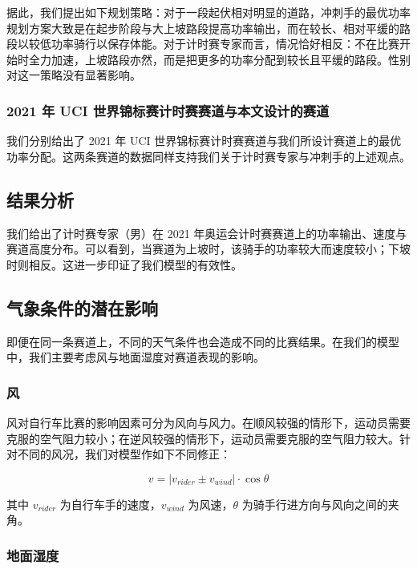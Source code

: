 \documentclass[11pt,a4paper]{ctexart}
\begin{document}
据此，我们提出如下规划策略：对于一段起伏相对明显的道路，冲刺手的最优功率规划方案大致是在起步阶段与大上坡路段提高功率输出，而在较长、相对平缓的路段以较低功率骑行以保存体能。对于计时赛专家而言，情况恰好相反：不在比赛开始时全力加速，上坡路段亦然，而是把更多的功率分配到较长且平缓的路段。性别对这一策略没有显著影响。

\subsubsection{2021 年 UCI 世界锦标赛计时赛赛道与本文设计的赛道}

我们分别给出了 2021 年 UCI 世界锦标赛计时赛赛道与我们所设计赛道上的最优功率分配。这两条赛道的数据同样支持我们关于计时赛专家与冲刺手的上述观点。

\subsection{结果分析}

我们给出了计时赛专家（男）在 2021 年奥运会计时赛赛道上的功率输出、速度与赛道高度分布。可以看到，当赛道为上坡时，该骑手的功率较大而速度较小；下坡时则相反。这进一步印证了我们模型的有效性。

\subsection{气象条件的潜在影响}

即便在同一条赛道上，不同的天气条件也会造成不同的比赛结果。在我们的模型中，我们主要考虑风与地面湿度对赛道表现的影响。

\subsubsection{风}

风对自行车比赛的影响因素可分为风向与风力。在顺风较强的情形下，运动员需要克服的空气阻力较小；在逆风较强的情形下，运动员需要克服的空气阻力较大。针对不同的风况，我们对模型作如下不同修正：

\begin{equation}
v=\left|v_{rider}\pm v_{wind}\right|\cdot\cos\theta
\end{equation}

其中 $v_{rider}$ 为自行车手的速度，$v_{wind}$ 为风速，$\theta$ 为骑手行进方向与风向之间的夹角。

\subsubsection{地面湿度}
\end{document}
